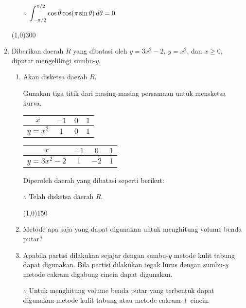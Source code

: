 \begin{enumerate}[leftmargin=*, label={\arabic*}.]
\begin{enumerate}[label={\alph*}.]
    $\therefore$ $\ds\int_{-\pi/2}^{\pi/2} \cos\theta\cos\brk*{\pi\sin\theta}\,d\theta = 0$
    
    \end{enumerate}

\begin{center}\line(1,0){300}\end{center}


\item Diberikan daerah $R$ yang dibatasi oleh $y=3x^{2}-2$, $y=x^{2}$, dan $x\geq 0$, diputar 
mengelilingi sumbu-$y$.
    \begin{enumerate}[label={\alph*}.]
    \item Akan disketsa daerah $R$.
    
    Gunakan tiga titik dari masing-masing persamaan untuk mensketsa kurva.
    \begin{center}
        \begin{tabular}{|c|c|c|c|}\hline
            $x$ & $-1$ & $0$ & $1$ \\ \hline
            $y=x^2$ & $1$ & $0$ & $1$ \\ \hline
        \end{tabular}\quad
        \begin{tabular}{|c|c|c|c|}\hline
            $x$ & $-1$ & $0$ & $1$ \\ \hline
            $y=3x^{2}-2$ & $1$ & $-2$ & $1$ \\ \hline
        \end{tabular}
    \end{center}
    Diperoleh daerah yang dibatasi seperti berikut:
    
    

    $\therefore$ Telah disketsa daerah $R$.


\begin{center}\line(1,0){150}\end{center}


    \item Metode apa saja yang dapat digunakan untuk menghitung volume benda putar?
    \item 
    Apabila partisi dilakukan sejajar dengan sumbu-$y$ metode kulit tabung dapat digunakan. 
    Bila partisi dilakukan tegak lurus dengan sumbu-$y$ metode cakram digabung cincin dapat 
    digunakan.

    $\therefore$ Untuk menghitung volume benda putar yang terbentuk dapat digunakan metode 
    kulit tabung atau metode cakram + cincin.



\end{enumerate}
\end{enumerate}
